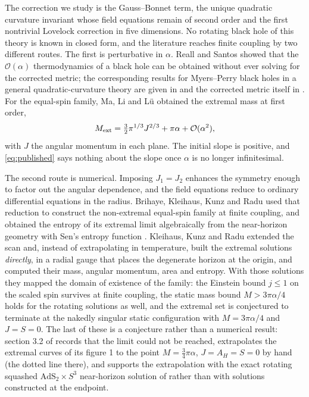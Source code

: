 \documentclass[11pt,a4paper]{article}
\begin{document}
The correction we study is the Gauss--Bonnet term, the unique quadratic
curvature invariant whose field equations remain of second order
\cite{Lovelock:1971yv} and the first nontrivial Lovelock correction in five
dimensions. No rotating black hole of this theory is known in closed form, and
the literature reaches finite coupling by two different routes. The first is
perturbative in $\alpha$. Reall and Santos \cite{Reall:2019sah} showed that the
$\mathcal O(\alpha)$ thermodynamics of a black hole can be obtained without
ever solving for the corrected metric; the corresponding results for
Myers--Perry black holes in a general quadratic-curvature theory are given in
\cite{Wu:2024xnb} and the corrected metric itself in \cite{Ma:2025qcf}. For the
equal-spin family, Ma, Li and L\"u \cite{Ma:2020xwi} obtained the extremal mass
at first order,
\begin{equation}
  M_{\mathrm{ext}}=\tfrac32\pi^{1/3}J^{2/3}+\pi\alpha+\mathcal O(\alpha^2),
  \label{eq:published}
\end{equation}
with $J$ the angular momentum in each plane. The initial slope is positive, and
\eqref{eq:published} says nothing about the slope once $\alpha$ is no longer
infinitesimal.

The second route is numerical. Imposing $J_1=J_2$ enhances the symmetry enough
to factor out the angular dependence, and the field equations reduce to
ordinary differential equations in the radius. Brihaye, Kleihaus, Kunz and Radu
\cite{Brihaye:2010wp} used that reduction to construct the non-extremal
equal-spin family at finite coupling, and obtained the entropy of its extremal
limit algebraically from the near-horizon geometry with Sen's entropy function
\cite{Sen:2007qy}. Kleihaus, Kunz and Radu \cite{Kleihaus:2023zzs} extended the
scan and, instead of extrapolating in temperature, built the extremal solutions
\emph{directly}, in a radial gauge that places the degenerate horizon at the
origin, and computed their mass, angular momentum, area and entropy. With those
solutions they mapped the domain of existence of the family: the Einstein bound
$j\le1$ on the scaled spin survives at finite coupling, the static mass bound
$M>3\pi\alpha/4$ holds for the rotating solutions as well, and the extremal set
is conjectured to terminate at the nakedly singular static configuration with
$M=3\pi\alpha/4$ and $J=S=0$. The last of these is a conjecture rather than a
numerical result: section 3.2 of \cite{Kleihaus:2023zzs} records that the limit could not be reached, extrapolates the extremal curves of
its figure 1 to the point $M=\tfrac34\pi\alpha$, $J=A_H=S=0$ by hand (the dotted
line there), and supports the extrapolation with the exact rotating squashed
$\mathrm{AdS}_2\times S^3$ near-horizon solution of \cite{Brihaye:2010wp} rather
than with solutions constructed at the endpoint.
\end{document}
